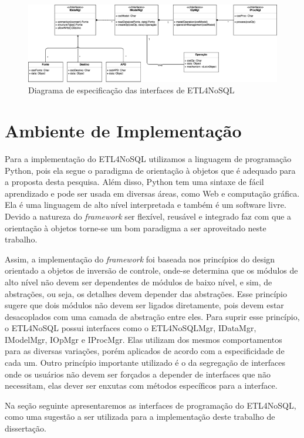 \begin{figure}[h!]
	\centering
	\includegraphics[scale=0.49]{fig/interfaces.png}
	\caption{Diagrama de especificação das interfaces de ETL4NoSQL}
	\label{interfaces}
\end{figure}


\section{Ambiente de Implementação}

Para a implementação do ETL4NoSQL utilizamos a linguagem de programação Python, pois ela segue o paradigma de orientação à objetos que é adequado para a proposta desta pesquisa. Além disso, Python tem uma sintaxe de fácil aprendizado e pode ser usada em diversas áreas, como Web e computação gráfica. Ela é uma linguagem de alto nível interpretada e também é um software livre. Devido a natureza do \textit{framework} ser flexível, reusável e integrado faz com que a orientação à objetos torne-se um bom paradigma a ser aproveitado neste trabalho.

Assim, a implementação do \textit{framework} foi baseada nos princípios do design orientado a objetos de inversão de controle, onde-se determina que os módulos de alto nível não devem ser dependentes de módulos de baixo nível, e sim, de abstrações, ou seja, os detalhes devem depender das abstrações. Esse princípio sugere que dois módulos não devem ser ligados diretamente, pois devem estar desacoplados com uma camada de abstração entre eles. Para suprir esse princípio, o ETL4NoSQL possui interfaces como o ETL4NoSQLMgr, IDataMgr, IModelMgr, IOpMgr e IProcMgr. Elas utilizam dos mesmos comportamentos para as diversas variações, porém aplicados de acordo com a especificidade de cada um. Outro princípio importante utilizado é o da segregação de interfaces onde os usuários não devem ser forçados a depender de interfaces que não necessitam, elas dever ser enxutas com métodos específicos para a interface. 

Na seção seguinte apresentaremos as interfaces de programação do ETL4NoSQL, como uma sugestão a ser utilizada para a implementação deste trabalho de dissertação.


